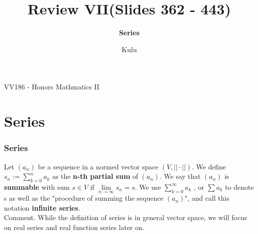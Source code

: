\documentclass{beamer}
\title{\sffamily Review VII(Slides 362 - 443)}
\subtitle{\textbf{Series}\\ }
\institute[UM-SJTU JI]{University of Michigan-Shanghai Jiao Tong University Joint Institute}
\author{Kulu}
\newcommand{\myfont}{\rmfamily\normalsize\upshape\mdseries}
\begin{document}
\begin{titlepage}
    \begin{center}
        VV186 - Honors Mathmatics II
    \end{center}
\end{titlepage}
\myfont


\section{Series}


\begin{frame}
    \frametitle{Series}
    \hspace{1em}
    Let $(a_n)$ be a sequence in a normed vector space $(V, ||\cdot||)$.
    We define $s_n:= \sum_{k=0}^n a_k$  as the \textbf{n-th partial sum} of $(a_n)$.
    We say that $(a_n)$ is \textbf{summable} with sum $s \in V$ if $\underset{n\to\infty}{\lim}⁡ s_n=s$.
    We use $\sum_{k=0}^\infty a_k$  , or $∑a_k$ to denote s as well as
    the "procedure of summing the sequence $(a_n)$",
    and call this notation \textbf{infinite series}.
    \\
    \vspace{1em}
    Comment. While the definition of series is in general vector space, we will focus on real series and real function series later on.
\end{frame}
\end{document}
